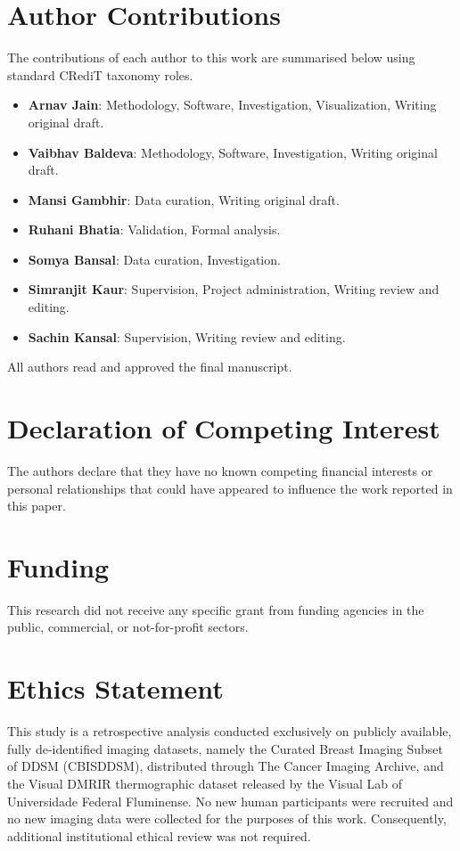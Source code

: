 \documentclass[lettersize,journal]{IEEEtran}
\begin{document}
\section*{Author Contributions}
The contributions of each author to this work are summarised below using standard CRediT taxonomy roles.
\begin{itemize}
    \item \textbf{Arnav Jain}: Methodology, Software, Investigation, Visualization, Writing \textendash{} original draft.
    \item \textbf{Vaibhav Baldeva}: Methodology, Software, Investigation, Writing \textendash{} original draft.
    \item \textbf{Mansi Gambhir}: Data curation, Writing \textendash{} original draft.
    \item \textbf{Ruhani Bhatia}: Validation, Formal analysis.
    \item \textbf{Somya Bansal}: Data curation, Investigation.
    \item \textbf{Simranjit Kaur}: Supervision, Project administration, Writing \textendash{} review and editing.
    \item \textbf{Sachin Kansal}: Supervision, Writing \textendash{} review and editing.
\end{itemize}
All authors read and approved the final manuscript.

\section*{Declaration of Competing Interest}
The authors declare that they have no known competing financial interests or personal relationships that could have appeared to influence the work reported in this paper.

\section*{Funding}
This research did not receive any specific grant from funding agencies in the public, commercial, or not-for-profit sectors.

\section*{Ethics Statement}
This study is a retrospective analysis conducted exclusively on publicly available, fully de-identified imaging datasets, namely the Curated Breast Imaging Subset of DDSM (CBIS\textendash DDSM), distributed through The Cancer Imaging Archive, and the Visual DMR\textendash IR thermographic dataset released by the Visual Lab of Universidade Federal Fluminense. No new human participants were recruited and no new imaging data were collected for the purposes of this work. Consequently, additional institutional ethical review was not required.
\end{document}
